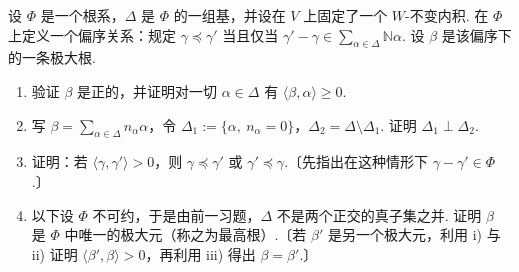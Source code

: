 \begin{exercise*}
设 $\Phi$ 是一个根系，$\Delta$ 是 $\Phi$ 的一组基，并设在 $V$ 上固定了一个 $W$-不变内积. 在 $\Phi$ 上定义一个偏序关系：规定 $\gamma\preceq\gamma'$ 当且仅当 $\gamma'-\gamma\in\sum_{\alpha\in\Delta}\mathbb{N}\alpha$. 设 $\beta$ 是该偏序下的一条极大根.
\begin{enumerate}[label=\roman*)]
\item 验证 $\beta$ 是正的，并证明对一切 $\alpha\in\Delta$ 有 $\langle\beta,\alpha\rangle\geqslant 0$.
\item 写 $\beta=\sum_{\alpha\in\Delta}n_{\alpha}\alpha$，令 $\Delta_1:=\{\alpha,\ n_{\alpha}=0\}$，$\Delta_2=\Delta\setminus\Delta_1$. 证明 $\Delta_1\perp\Delta_2$.
\item 证明：若 $\langle\gamma,\gamma'\rangle>0$，则 $\gamma\preceq\gamma'$ 或 $\gamma'\preceq\gamma$.〔先指出在这种情形下 $\gamma-\gamma'\in\Phi$.〕
\item 以下设 $\Phi$ 不可约，于是由前一习题，$\Delta$ 不是两个正交的真子集之并. 证明 $\beta$ 是 $\Phi$ 中唯一的极大元（称之为最高根）.〔若 $\beta'$ 是另一个极大元，利用 i) 与 ii) 证明 $\langle\beta',\beta\rangle>0$，再利用 iii) 得出 $\beta=\beta'$.〕
\end{enumerate}
\end{exercise*}
